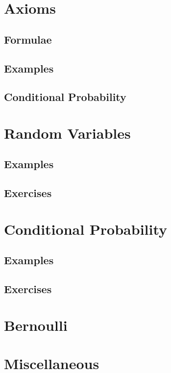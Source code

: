 \documentclass[journal,a5paper]{IEEEtran}
\begin{document}
\section{Axioms}
\subsection{Formulae}

\subsection{Examples}

\subsection{Conditional Probability}

\section{Random Variables}
\subsection{Examples}

\subsection{Exercises}

\section{Conditional Probability}
\subsection{Examples}

\subsection{Exercises}

\section{Bernoulli}


    \section{Miscellaneous}

\iffalse
\end{document}

